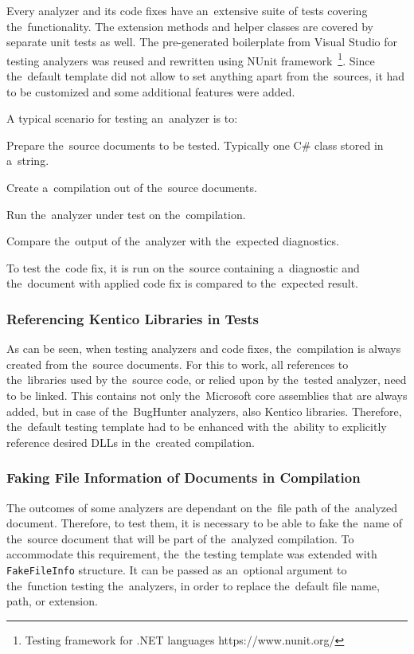 \documentclass[
  digital, %
  table,   %
  lof,     %
  lot,     %
  oneside,
]{fithesis3}
\begin{document}
Every analyzer and its code fixes have an~extensive suite of tests covering the~functionality. The extension methods and helper classes are covered by separate unit tests as well. The pre-generated boilerplate from Visual Studio for testing analyzers was reused and rewritten using NUnit framework~\footnote{Testing framework for .NET languages https://www.nunit.org/}. Since the~default template did not allow to set anything apart from the~sources, it had to be customized and some additional features were added.

A typical scenario for testing an~analyzer is to:
\begin{compactenum}
  \item Prepare the~source documents to be tested. Typically one C\# class stored in a~string.
  \item Create a~compilation out of the~source documents.
  \item Run the~analyzer under test on the~compilation.
  \item Compare the~output of the~analyzer with the~expected diagnostics.
\end{compactenum}

To test the~code fix, it is run on the~source containing a~diagnostic and the~document with applied code fix is compared to the~expected result.

\subsubsection{Referencing Kentico Libraries in Tests}
As can be seen, when testing analyzers and code fixes, the~compilation is always created from the~source documents. For this to work, all references to the~libraries used by the~source code, or relied upon by the~tested analyzer, need to be linked. This contains not only the~Microsoft core assemblies that are always added, but in case of the~BugHunter analyzers, also Kentico libraries. Therefore, the~default testing template had to be enhanced with the~ability to explicitly reference desired DLLs in the~created compilation.

\subsubsection{Faking File Information of Documents in Compilation}
The outcomes of some analyzers are dependant on the~file path of the~analyzed document. Therefore, to test them, it is necessary to be able to fake the~name of the~source document that will be part of the~analyzed compilation. To accommodate this requirement, the~the testing template was extended with \texttt{FakeFileInfo} structure. It can be passed as an~optional argument to the~function testing the~analyzers, in order to replace the~default file name, path, or extension.
\end{document}
